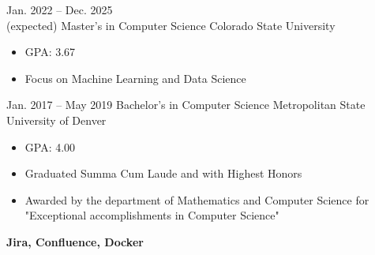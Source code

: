 \documentclass[8pt]{resumeclass}
\begin{document}

\begin{entrylist}
	\entry
		{Jan. 2022 -- Dec. 2025\\ (expected)}
		{Master's in Computer Science}
		{Colorado State University}
		{{\vspace{-4mm}\begin{itemize}[noitemsep,nolistsep]
			\small
			\item GPA: 3.67
			\item Focus on Machine Learning and Data Science
		\end{itemize}}}
	\entry
		{Jan. 2017 -- May 2019}
		{Bachelor's in Computer Science}
		{Metropolitan State University of Denver}
		{{\vspace{-4mm}\begin{itemize}[noitemsep,nolistsep]
			\small
			\item GPA: 4.00
			\item Graduated Summa Cum Laude and with Highest Honors
			\item Awarded by the department of Mathematics and Computer Science for "Exceptional accomplishments in Computer Science"
		\end{itemize}}}
\end{entrylist}


\vspace{6pt}
\begin{minipage}[t]{0.5\textwidth}
	\vspace{-\baselineskip}

\end{minipage}
\hfill
\begin{minipage}[t]{0.5\textwidth}
	\vspace{-\baselineskip}

	\textbf{Jira, Confluence, Docker}\\
\end{minipage}
\end{document}
